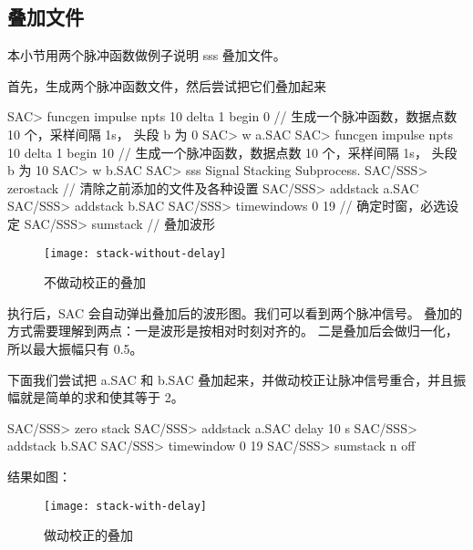 \subsection{叠加文件}

本小节用两个脉冲函数做例子说明 sss 叠加文件。

首先，生成两个脉冲函数文件，然后尝试把它们叠加起来

\begin{SACCode}
SAC> funcgen impulse npts 10 delta 1 begin 0
// 生成一个脉冲函数，数据点数 10 个，采样间隔 1s， 头段 b 为 0
SAC> w a.SAC
SAC> funcgen impulse npts 10 delta 1 begin 10
// 生成一个脉冲函数，数据点数 10 个，采样间隔 1s， 头段 b 为 10
SAC> w b.SAC
SAC> sss
 Signal Stacking Subprocess.
SAC/SSS> zerostack         // 清除之前添加的文件及各种设置
SAC/SSS> addstack a.SAC
SAC/SSS> addstack b.SAC
SAC/SSS> timewindows 0 19    // 确定时窗，必选设定
SAC/SSS> sumstack    // 叠加波形
\end{SACCode}

\begin{figure}[H]
\centering
\texttt{[image: stack-without-delay]}
\caption{不做动校正的叠加}
\label{fig:filter-waveform}
\end{figure}

执行后，SAC 会自动弹出叠加后的波形图。我们可以看到两个脉冲信号。
叠加的方式需要理解到两点：一是波形是按相对时刻对齐的。
二是叠加后会做归一化，所以最大振幅只有 0.5。

下面我们尝试把 a.SAC 和 b.SAC 叠加起来，并做动校正让脉冲信号重合，并且振幅就是简单的求和使其等于 2。

\begin{SACCode}
SAC/SSS> zero stack
SAC/SSS> addstack a.SAC delay 10 s
SAC/SSS> addstack b.SAC
SAC/SSS> timewindow 0 19
SAC/SSS> sumstack n off
\end{SACCode}

结果如图：

\begin{figure}[H]
\centering
\texttt{[image: stack-with-delay]}
\caption{做动校正的叠加}
\label{fig:filter-waveform}
\end{figure}
